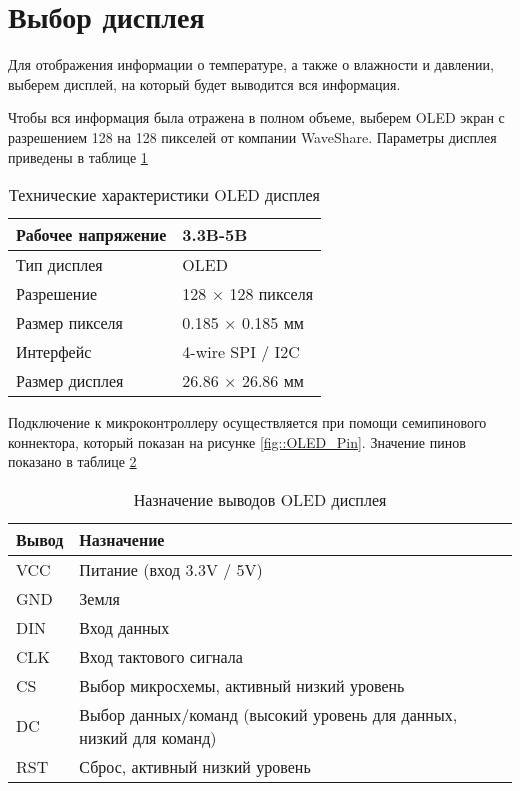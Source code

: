 \section {Выбор дисплея}

Для отображения информации о температуре, а также о влажности и давлении, выберем дисплей, на который будет выводится вся информация. 

Чтобы вся информация была отражена в полном объеме, выберем OLED экран с разрешением 128 на 128 пикселей от компании WaveShare. Параметры дисплея приведены в таблице \ref{tab::specifications}

\begin{table}[h!]
	\centering
	\caption{Технические характеристики OLED дисплея}
	\begin{tabular}{| m{7cm} | m{7cm} |}
		\hline
		Рабочее напряжение & 3.3B-5B \\ \hline
		Тип дисплея & OLED \\ \hline
		Разрешение & 128 × 128 пикселя \\ \hline
		Размер пикселя & 0.185 × 0.185 мм \\ \hline
		Интерфейс & 4-wire SPI / I2C \\ \hline
		Размер дисплея & 26.86 × 26.86 мм \\ \hline
	\end{tabular}
	
	\label{tab::specifications}
\end{table}

Подключение к микроконтроллеру осуществляется при помощи семипинового коннектора, который показан на рисунке \ref{fig::OLED_Pin}. Значение пинов показано в таблице \ref{tab::pinout}


\begin{table}[htb]
	\centering
	\caption{Назначение выводов OLED дисплея}
	\begin{tabular}{| m{2cm} | m{10cm} |}
		\hline
		\textbf{Вывод} & \textbf{Назначение} \\ \hline
		VCC & Питание (вход 3.3V / 5V) \\ \hline
		GND & Земля \\ \hline
		DIN & Вход данных \\ \hline
		CLK & Вход тактового сигнала \\ \hline
		CS & Выбор микросхемы, активный низкий уровень \\ \hline
		DC & Выбор данных/команд (высокий уровень для данных, низкий для команд) \\ \hline
		RST & Сброс, активный низкий уровень \\ \hline
		\end{tabular}
	\label{tab::pinout}
\end{table}

